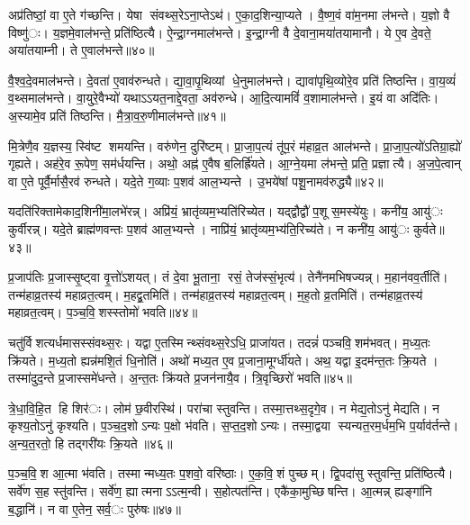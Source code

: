 अप्र॑तिष्ठां॒ वा ए॒ते ग॑च्छन्ति। येषा संवथ्स॒रेऽना॒प्तेऽथ॑। ए॒का॒द॒शिन्या॒प्यते। वै॒ष्ण॒वं वा॑म॒नमा ल॑भन्ते। य॒ज्ञो वै विष्णु॑ः। य॒ज्ञमे॒वाल॑भन्ते॒ प्रति॑ष्ठित्यै। ऐ॒न्द्रा॒ग्नमाल॑भन्ते। इ॒न्द्रा॒ग्नी वै दे॒वाना॒मया॑तयामानौ। ये ए॒व दे॒वते॒ अया॑तयाम्नी। ते ए॒वाल॑भन्ते॥४०॥

वै॒श्व॒दे॒वमाल॑भन्ते। दे॒वता॑ ए॒वाव॑रुन्धते। द्या॒वा॒पृ॒थिव्यां धे॒नुमाल॑भन्ते। द्यावा॑पृथि॒व्योरे॒व प्रति॑ तिष्ठन्ति। वा॒य॒व्यं॑ व॒थ्समाल॑भन्ते। वा॒युरे॒वैभ्यो॑ यथाऽऽयत॒नाद्दे॒वता॒ अव॑रुन्धे। आ॒दि॒त्यामविं॑ व॒शामाल॑भन्ते। इ॒यं वा अदि॑तिः। अ॒स्यामे॒व प्रति॑ तिष्ठन्ति। मै॒त्रा॒व॒रु॒णीमाल॑भन्ते॥४१॥

मि॒त्रेणै॒व य॒ज्ञस्य॒ स्वि॑ष्ट शमयन्ति। वरु॑णेन॒ दुरि॑ष्टम्। प्रा॒जा॒प॒त्यं तू॑प॒रं म॑हाव्र॒त आल॑भन्ते। प्रा॒जा॒प॒त्यो॑ऽतिग्रा॒ह्यो॑ गृह्यते। अह॑रे॒व रू॒पेण॒ सम॑र्धयन्ति। अथो॒ अह्न॑ ए॒वैष ब॒लिर्ह्रि॑यते। आ॒ग्ने॒यमा ल॑भन्ते॒ प्रति॒ प्रज्ञात्यै। अ॒ज॒पे॒त्वान् वा ए॒ते पूर्वै॒र्मासै॒रव॑ रुन्धते। यदे॒ते ग॒व्याः प॒शव॑ आल॒भ्यन्ते। उ॒भये॑षां पशू॒नामव॑रुद्ध्यै॥४२॥

यदति॑रिक्तामेकाद॒शिनी॑मा॒लभे॑रन्न्। अप्रि॑यं॒ भ्रातृ॑व्यम॒भ्यति॑रिच्येत। यद्द्वौद्वौ॑ प॒शू स॒मस्ये॑युः। कनी॑य॒ आयु॑ः कुर्वीरन्न्। यदे॒ते ब्राह्म॑णवन्तः प॒शव॑ आल॒भ्यन्ते। नाप्रि॑यं॒ भ्रातृ॑व्यम॒भ्य॑ति॒रिच्य॑ते। न कनी॑य॒ आयु॑ः कुर्वते॥४३॥


प्र॒जाप॑तिः प्र॒जास्सृ॒ष्ट्वा वृ॒त्तो॑ऽशयत्। तं दे॒वा भू॒ताना॒ रसं॒ तेज॑स्सं॒भृत्य॑। तेनै॑नमभिषज्यन्न्। म॒हान॑वव॒र्तीति॑। तन्म॑हाव्र॒तस्य॑ महाव्रत॒त्वम्। म॒हद्व्र॒तमिति॑। तन्म॑हाव्र॒तस्य॑ महाव्रत॒त्वम्। म॒ह॒तो व्र॒तमिति॑। तन्म॑हाव्र॒तस्य॑ महाव्रत॒त्वम्। प॒ञ्च॒वि॒शस्स्तोमो॑ भवति॥४४॥

चतु॑र्विशत्यर्धमासस्संवथ्स॒रः। यद्वा ए॒तस्मिन्थ्संवथ्स॒रेऽधि॒ प्राजा॑यत। तदन्नं॑ पञ्चवि॒शम॑भवत्। म॒ध्य॒तः क्रि॑यते। म॒ध्य॒तो ह्यन्न॑मशि॒तं धि॒नोति॑। अथो॑ मध्य॒त ए॒व प्र॒जाना॒मूर्ग्धी॑यते। अथ॒ यद्वा इ॒दम॑न्त॒तः क्रि॒यते। तस्मा॑दुद॒न्ते प्र॒जास्समे॑धन्ते। अ॒न्त॒तः क्रि॑यते प्र॒जन॑नायै॒व। त्रि॒वृच्छिरो॑ भवति॥४५॥

त्रे॒धा॒वि॒हि॒त हि शिर॑ः। लोम॑ छ॒वीरस्थि॑। परा॑चा स्तुवन्ति। तस्मा॒त्तथ्स॒दृगे॒व। न मेद्य॒तोऽनु॑ मेद्यति। न कृश्य॒तोऽनु॑ कृश्यति। प॒ञ्च॒द॒शोऽन्यः प॒क्षो भ॑वति। स॒प्त॒द॒शोऽन्यः। तस्मा॒द्वया स्यन्यत॒रम॒र्धम॒भि प॒र्याव॑र्तन्ते। अ॒न्य॒त॒रतो॒ हि तद्गरी॑यः क्रि॒यते॥४६॥

प॒ञ्च॒वि॒श आ॒त्मा भ॑वति। तस्मान्मध्य॒तः प॒शवो॒ वरि॑ष्ठाः। ए॒क॒वि॒शं पुच्छम्। द्वि॒पदा॑सु स्तुवन्ति॒ प्रति॑ष्ठित्यै। सर्वे॑ण स॒ह स्तु॑वन्ति। सर्वे॑ण॒ ह्यात्मनाऽऽत्म॒न्वी। स॒होत्पत॑न्ति। एकै॑का॒मुच्छिषन्ति। आ॒त्मन्न् ह्यङ्गा॑नि ब॒द्धानि॑। न वा ए॒तेन॒ सर्व॒ः पुरु॑षः॥४७॥

